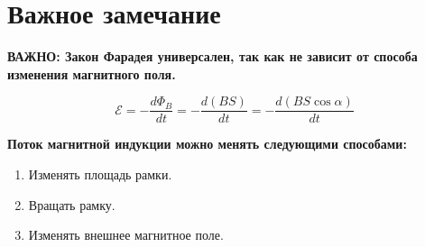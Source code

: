 \section*{Важное замечание}

\textbf{ВАЖНО: Закон Фарадея универсален, так как не зависит от способа изменения магнитного поля.}

\vspace{1em}

\[
\mathcal{E} = -\frac{d\Phi_B}{dt} = -\frac{d(B S)}{dt} = -\frac{d(B S \cos \alpha)}{dt}
\]

\vspace{1em}

\textbf{Поток магнитной индукции можно менять следующими способами:}

\begin{enumerate}
    \item Изменять площадь рамки.
    \item Вращать рамку.
    \item Изменять внешнее магнитное поле.
\end{enumerate}

